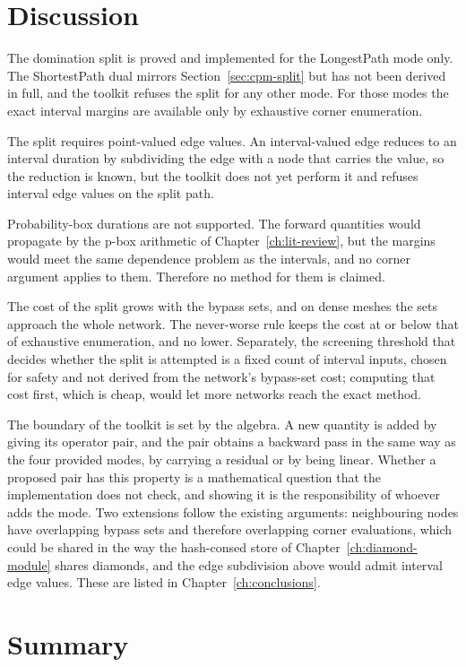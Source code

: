 \documentclass[12pt]{report}
\begin{document}
\section{Discussion}
\label{sec:cpm-discussion}

The domination split is proved and implemented for the LongestPath mode only. The
ShortestPath dual mirrors Section~\ref{sec:cpm-split} but has not been derived in full,
and the toolkit refuses the split for any other mode. For those modes the exact interval
margins are available only by exhaustive corner enumeration.

The split requires point-valued edge values. An interval-valued edge reduces to an interval
duration by subdividing the edge with a node that carries the value, so the reduction is
known, but the toolkit does not yet perform it and refuses interval edge values on the
split path.

Probability-box durations are not supported. The forward quantities would propagate by the
p-box arithmetic of Chapter~\ref{ch:lit-review}, but the margins would meet the same
dependence problem as the intervals, and no corner argument applies to them. Therefore no
method for them is claimed.

The cost of the split grows with the bypass sets, and on dense meshes the sets approach the
whole network. The never-worse rule keeps the cost at or below that of exhaustive
enumeration, and no lower. Separately, the screening threshold that decides whether the
split is attempted is a fixed count of interval inputs, chosen for safety and not derived
from the network's bypass-set cost; computing that cost first, which is cheap, would let
more networks reach the exact method.

The boundary of the toolkit is set by the algebra. A new
quantity is added by giving its operator pair, and the pair obtains a backward pass in the
same way as the four provided modes, by carrying a residual or by being linear. Whether a
proposed pair has this property is a mathematical question that the implementation does
not check, and showing it is the responsibility of whoever adds the mode. Two extensions
follow the existing arguments: neighbouring nodes have overlapping bypass sets and
therefore overlapping corner evaluations, which could be shared in the way the hash-consed
store of Chapter~\ref{ch:diamond-module} shares diamonds, and the edge subdivision above
would admit interval edge values. These are listed in Chapter~\ref{ch:conclusions}.

\section{Summary}
\label{sec:cpm-summary}
\end{document}
